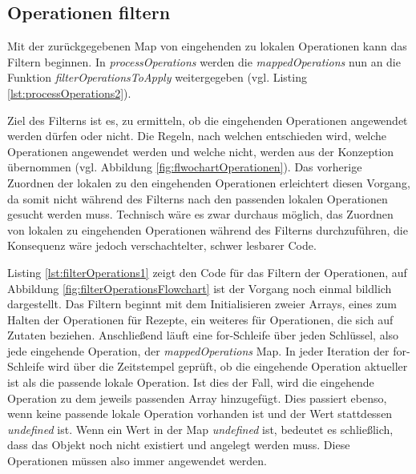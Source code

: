 \documentclass[a4paper, 12pt]{scrreprt}
\begin{document}
\begin{minipage}{\linewidth}
	
\end{minipage}

\subsection{Operationen filtern}
\label{sec:filtern}

Mit der zurückgegebenen Map von eingehenden zu lokalen Operationen kann das Filtern beginnen. In \textit{processOperations} werden die \textit{mappedOperations} nun an die Funktion \textit{filterOperationsToApply} weitergegeben (vgl. Listing \ref{lst:processOperations2}).

\begin{minipage}{\linewidth}
	
\end{minipage}

Ziel des Filterns ist es, zu ermitteln, ob die eingehenden Operationen angewendet werden dürfen oder nicht. Die Regeln, nach welchen entschieden wird, welche Operationen angewendet werden und welche nicht, werden aus der Konzeption übernommen (vgl. Abbildung \ref{fig:flwochartOperationen}). Das vorherige Zuordnen der lokalen zu den eingehenden Operationen erleichtert diesen Vorgang, da somit nicht während des Filterns nach den passenden lokalen Operationen gesucht werden muss. Technisch wäre es zwar durchaus möglich, das Zuordnen von lokalen zu eingehenden Operationen während des Filterns durchzuführen, die Konsequenz wäre jedoch verschachtelter, schwer lesbarer Code.

Listing \ref{lst:filterOperations1} zeigt den Code für das Filtern der Operationen, auf Abbildung \ref{fig:filterOperationsFlowchart} ist der Vorgang noch einmal bildlich dargestellt. Das Filtern beginnt mit dem Initialisieren zweier Arrays, eines zum Halten der Operationen für Rezepte, ein weiteres für Operationen, die sich auf Zutaten beziehen. Anschließend läuft eine for-Schleife über jeden Schlüssel, also jede eingehende Operation, der \textit{mappedOperations} Map. In jeder Iteration der for-Schleife wird über die Zeitstempel geprüft, ob die eingehende Operation aktueller ist als die passende lokale Operation. Ist dies der Fall, wird die eingehende Operation zu dem jeweils passenden Array hinzugefügt. Dies passiert ebenso, wenn keine passende lokale Operation vorhanden ist und der Wert stattdessen \textit{undefined} ist. Wenn ein Wert in der Map \textit{undefined} ist, bedeutet es schließlich, dass das Objekt noch nicht existiert und angelegt werden muss. Diese Operationen müssen also immer angewendet werden. 
\end{document}
